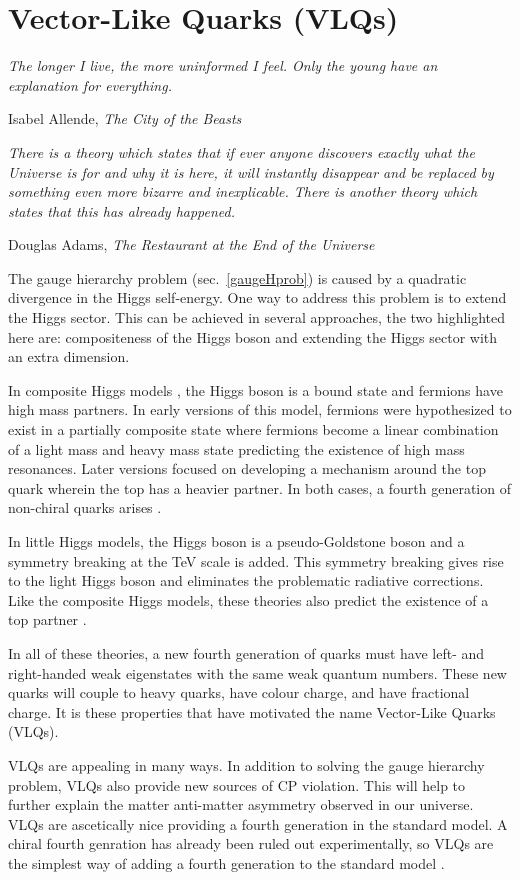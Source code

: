\chapter{Vector-Like Quarks (VLQs) }
\epigraph{\itshape The longer I live, the more uninformed I feel. Only the young have an explanation for everything.}{Isabel Allende, \textit{The City of the Beasts} }

\epigraph{\itshape There is a theory which states that if ever anyone discovers exactly what the Universe is for and why it is here, it will instantly disappear and be replaced by something even more bizarre and inexplicable. There is another theory which states that this has already happened.}{Douglas Adams, \textit{The Restaurant at the End of the Universe}}

The gauge hierarchy problem (sec.~\ref{gaugeHprob}) is caused by a quadratic divergence in the Higgs self-energy. One way to address this problem is to extend the Higgs sector. This can be achieved in several approaches, the two highlighted here are: compositeness of the Higgs boson and extending the Higgs sector with an extra dimension.

In composite Higgs models \cite{Kaplan}, the Higgs boson is a bound state and fermions have high mass partners. In early versions of this model, fermions were hypothesized to exist in a partially composite state where fermions become a linear combination of a light mass and heavy mass state predicting the existence of high mass resonances. Later versions focused on developing a mechanism around the top quark wherein the top has a heavier partner. In both cases, a fourth generation of non-chiral quarks arises \cite{compositeHiggs}.

In little Higgs models, the Higgs boson is a pseudo-Goldstone boson and a symmetry breaking at the TeV scale is added. This symmetry breaking gives rise to the light Higgs boson and eliminates the problematic radiative corrections. Like the composite Higgs models, these theories also predict the existence of a top partner \cite{littleHiggs}.

In all of these theories, a new fourth generation of quarks must have left- and right-handed weak eigenstates with the same weak quantum numbers. These new quarks will couple to heavy quarks, have colour charge, and have fractional charge. It is these properties that have motivated the name Vector-Like Quarks (VLQs).

VLQs are appealing in many ways. In addition to solving the gauge hierarchy problem, VLQs also provide new sources of CP violation. This will help to further explain the matter anti-matter asymmetry observed in our universe. VLQs are ascetically nice providing a fourth generation in the standard model. A chiral fourth genration has already been ruled out experimentally, so VLQs are the simplest way of adding a fourth generation to the standard model \cite{VLQHandbook}. 

